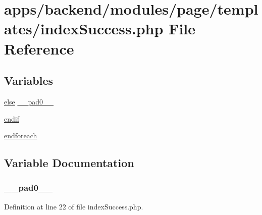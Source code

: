 \hypertarget{backend_2modules_2page_2templates_2index_success_8php}{\section{apps/backend/modules/page/templates/index\-Success.php File Reference}
\label{backend_2modules_2page_2templates_2index_success_8php}
}
\subsection*{Variables}
\begin{DoxyCompactItemize}
\item 
\hyperlink{live_2modules_2team_2templates_2management_success_8php_a0544c3fe466e421738dae463968b70ba}{else} \hyperlink{backend_2modules_2page_2templates_2index_success_8php_a8e01dcc96c43199448ee66f7c2ae8ea6}{\-\_\-\-\_\-pad0\-\_\-\-\_\-}
\item 
\hyperlink{backend_2modules_2page_2templates_2index_success_8php_a82cd33ca97ff99f2fcc5e9c81d65251b}{endif}
\item 
\hyperlink{backend_2modules_2page_2templates_2index_success_8php_a672d9707ef91db026c210f98cc601123}{endforeach}
\end{DoxyCompactItemize}


\subsection{Variable Documentation}
\hypertarget{backend_2modules_2page_2templates_2index_success_8php_a8e01dcc96c43199448ee66f7c2ae8ea6}{
\subsubsection[{\-\_\-\-\_\-pad0\-\_\-\-\_\-}]{ \-\_\-\-\_\-pad0\-\_\-\-\_\-}}\label{backend_2modules_2page_2templates_2index_success_8php_a8e01dcc96c43199448ee66f7c2ae8ea6}


Definition at line 22 of file index\-Success.\-php.

